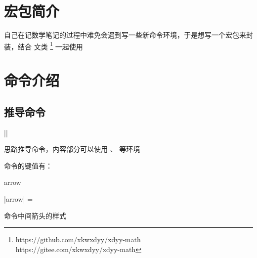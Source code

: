 \documentclass{xdyy-usermanual}
\begin{document}
\maketitle
\tableofcontents



\section{宏包简介}

自己在记数学笔记的过程中难免会遇到写一些新命令环境，于是想写一个宏包来封装，结合  文类 \footnote{
  https://github.com/xkwxdyy/xdyy-math \\
  https://gitee.com/xkwxdyy/xdyy-math
}
一起使用


\section{命令介绍}



\subsection{推导命令  }

\begin{function}[added = 2022-1-12]{\deduce}
  \begin{syntax}
    |\deduce|   
  \end{syntax}
  思路推导命令，内容部分可以使用 、 等环境
  \begin{hexample}
  \end{hexample}
\end{function}

 命令的键值有：

\begin{function}[added = 2022-01-12]{arrow}
  \begin{syntax}
    |arrow| =  \init{$\Longrightarrow$}
  \end{syntax}
  命令中间箭头的样式
\end{function}
\end{document}
